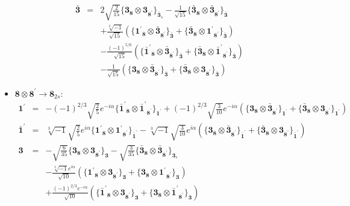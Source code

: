 \documentclass[english]{article}
\newcommand{\subcg}[3]{\big\{ {#1}\otimes{#2}\big\}^{}_{#3}}
\newcommand{\rep}[1]{\mathbf{#1}}
\begin{document}
\begin{itemize}
\begin{eqnarray*}
\\
\rep{\bar{3}} &=& 2 \sqrt{\frac{2}{15}}\subcg{\rep{3}_{\rep{8}}}{\rep{3}_{\rep{8^{\prime}}}}{\rep{\bar{3}}_{s}}-\frac{1}{\sqrt{15}}\subcg{\rep{\bar{3}}_{\rep{8}}}{\rep{\bar{3}}_{\rep{8^{\prime}}}}{\rep{\bar{3}}} \\ 
 & & +\frac{\sqrt[6]{-1}}{\sqrt{15}}\left(\subcg{\rep{1^{\prime}}_{\rep{8}}}{\rep{\bar{3}}_{\rep{8^{\prime}}}}{\rep{\bar{3}}}+\subcg{\rep{\bar{3}}_{\rep{8}}}{\rep{1^{\prime}}_{\rep{8^{\prime}}}}{\rep{\bar{3}}}\right) \\ 
 & & -\frac{(-1)^{5/6}}{\sqrt{15}}\left(\subcg{\rep{\bar{1}^{\prime}}_{\rep{8}}}{\rep{\bar{3}}_{\rep{8^{\prime}}}}{\rep{\bar{3}}}+\subcg{\rep{\bar{3}}_{\rep{8}}}{\rep{\bar{1}^{\prime}}_{\rep{8^{\prime}}}}{\rep{\bar{3}}}\right) \\ 
 & & -\frac{1}{\sqrt{15}}\left(\subcg{\rep{3}_{\rep{8}}}{\rep{\bar{3}}_{\rep{8^{\prime}}}}{\rep{\bar{3}}}+\subcg{\rep{\bar{3}}_{\rep{8}}}{\rep{3}_{\rep{8^{\prime}}}}{\rep{\bar{3}}}\right)
\end{eqnarray*}
\item $\rep{8}\otimes\rep{8^{\prime}}\to\rep{8}_{2s}$:
\begin{eqnarray*}
\rep{1^{\prime}} &=& -(-1)^{2/3} \sqrt{\frac{2}{5}} e^{-i \alpha }\subcg{\rep{\bar{1}^{\prime}}_{\rep{8}}}{\rep{\bar{1}^{\prime}}_{\rep{8^{\prime}}}}{\rep{1^{\prime}}}+(-1)^{2/3} \sqrt{\frac{3}{10}} e^{-i \alpha }\left(\subcg{\rep{3}_{\rep{8}}}{\rep{\bar{3}}_{\rep{8^{\prime}}}}{\rep{1^{\prime}}}+\subcg{\rep{\bar{3}}_{\rep{8}}}{\rep{3}_{\rep{8^{\prime}}}}{\rep{1^{\prime}}}\right)
\\
\rep{\bar{1}^{\prime}} &=& \sqrt[3]{-1} \sqrt{\frac{2}{5}} e^{i \alpha }\subcg{\rep{1^{\prime}}_{\rep{8}}}{\rep{1^{\prime}}_{\rep{8^{\prime}}}}{\rep{\bar{1}^{\prime}}}-\sqrt[3]{-1} \sqrt{\frac{3}{10}} e^{i \alpha }\left(\subcg{\rep{3}_{\rep{8}}}{\rep{\bar{3}}_{\rep{8^{\prime}}}}{\rep{\bar{1}^{\prime}}}+\subcg{\rep{\bar{3}}_{\rep{8}}}{\rep{3}_{\rep{8^{\prime}}}}{\rep{\bar{1}^{\prime}}}\right)
\\
\rep{3} &=& -\sqrt{\frac{6}{35}}\subcg{\rep{3}_{\rep{8}}}{\rep{3}_{\rep{8^{\prime}}}}{\rep{3}}-\sqrt{\frac{3}{35}}\subcg{\rep{\bar{3}}_{\rep{8}}}{\rep{\bar{3}}_{\rep{8^{\prime}}}}{\rep{3}_{s}} \\ 
 & & -\frac{\sqrt[3]{-1} e^{i \alpha }}{\sqrt{10}}\left(\subcg{\rep{1^{\prime}}_{\rep{8}}}{\rep{3}_{\rep{8^{\prime}}}}{\rep{3}}+\subcg{\rep{3}_{\rep{8}}}{\rep{1^{\prime}}_{\rep{8^{\prime}}}}{\rep{3}}\right) \\ 
 & & +\frac{(-1)^{2/3} e^{-i \alpha }}{\sqrt{10}}\left(\subcg{\rep{\bar{1}^{\prime}}_{\rep{8}}}{\rep{3}_{\rep{8^{\prime}}}}{\rep{3}}+\subcg{\rep{3}_{\rep{8}}}{\rep{\bar{1}^{\prime}}_{\rep{8^{\prime}}}}{\rep{3}}\right) \\ 

\end{eqnarray*}
\end{itemize}
\end{document}
